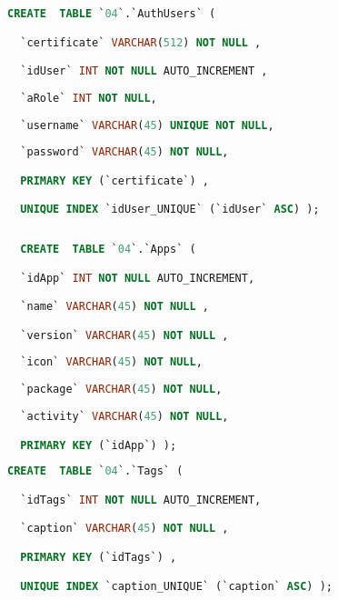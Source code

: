 \begin{Code}
\begin{lstlisting}[language=SQL,breaklines=true, label=createAuthUsers, caption=Create AuthUsers]
  CREATE  TABLE `04`.`AuthUsers` (

  `certificate` VARCHAR(512) NOT NULL ,

  `idUser` INT NOT NULL AUTO_INCREMENT ,
  
  `aRole` INT NOT NULL,
    
  `username` VARCHAR(45) UNIQUE NOT NULL,
  
  `password` VARCHAR(45) NOT NULL,

  PRIMARY KEY (`certificate`) ,

  UNIQUE INDEX `idUser_UNIQUE` (`idUser` ASC) );
\end{lstlisting}
\end{Code}

\begin{Code}
\begin{lstlisting}[language=SQL,breaklines=true, label=createApps, caption=Create Apps, ]
  
  CREATE  TABLE `04`.`Apps` (

  `idApp` INT NOT NULL AUTO_INCREMENT,

  `name` VARCHAR(45) NOT NULL ,

  `version` VARCHAR(45) NOT NULL ,
  
  `icon` VARCHAR(45) NOT NULL,
  
  `package` VARCHAR(45) NOT NULL,
  
  `activity` VARCHAR(45) NOT NULL,

  PRIMARY KEY (`idApp`) );
\end{lstlisting}
\end{Code}

\begin{Code}
\begin{lstlisting}[language=SQL,breaklines=true, label=createTags, caption=Create Tags, ]
CREATE  TABLE `04`.`Tags` (

  `idTags` INT NOT NULL AUTO_INCREMENT,

  `caption` VARCHAR(45) NOT NULL ,

  PRIMARY KEY (`idTags`) ,

  UNIQUE INDEX `caption_UNIQUE` (`caption` ASC) );

\end{lstlisting}
\end{Code}

